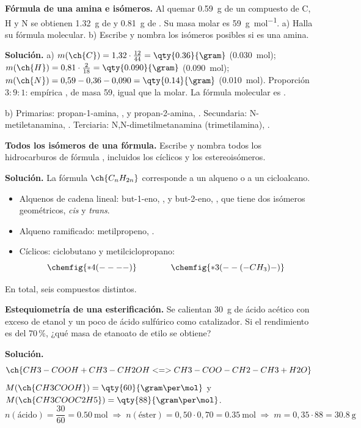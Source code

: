 \begin{example}
    \textbf{Fórmula de una amina e isómeros.} Al quemar \qty{0.59}{\gram} de un compuesto de C, H y N se obtienen
    \qty{1.32}{\gram} de  y \qty{0.81}{\gram} de . Su masa molar es \qty{59}{\gram\per\mol}. a) Halla su fórmula
    molecular. b) Escribe y nombra los isómeros posibles si es una amina.

    \textbf{Solución.} a) \(m(\ch{C}) = 1{,}32 \cdot \frac{12}{44} = \qty{0.36}{\gram}\) (\qty{0.030}{\mol});
    \(m(\ch{H}) = 0{,}81 \cdot \frac{2}{18} = \qty{0.090}{\gram}\) (\qty{0.090}{\mol}); \(m(\ch{N}) = 0{,}59 - 0{,}36 - 0{,}090 =
    \qty{0.14}{\gram}\) (\qty{0.010}{\mol}). Proporción \(3 : 9 : 1\): empírica , de masa 59, igual que la molar. La
    fórmula molecular es .

    b) Primarias: propan-1-amina, , y propan-2-amina, . Secundaria: N-metiletanamina,
    . Terciaria: N,N-dimetilmetanamina (trimetilamina), .
\end{example}

\begin{example}
    \textbf{Todos los isómeros de una fórmula.} Escribe y nombra todos los hidrocarburos de fórmula , incluidos los
    cíclicos y los estereoisómeros.

    \textbf{Solución.} La fórmula \(\ch{C_nH_{2n}}\) corresponde a un alqueno o a un cicloalcano.
    \begin{itemize}
        \item Alquenos de cadena lineal: but-1-eno, , y but-2-eno, , que tiene dos isómeros
        geométricos, \emph{cis} y \emph{trans}.
        \item Alqueno ramificado: metilpropeno, .
        \item Cíclicos: ciclobutano y metilciclopropano:
        \[ \chemfig{*4(----)} \qquad\qquad \chemfig{*3(--(-CH_3)-)} \]
    \end{itemize}
    En total, seis compuestos distintos.
\end{example}

\begin{example}
    \textbf{Estequiometría de una esterificación.} Se calientan \qty{30}{\gram} de ácido acético con exceso de etanol y un poco de
    ácido sulfúrico como catalizador. Si el rendimiento es del 70\,\%, ¿qué masa de etanoato de etilo se obtiene?

    \textbf{Solución.}
    \[ \ch{CH3-COOH + CH3-CH2OH <=> CH3-COO-CH2-CH3 + H2O} \]
    \(M(\ch{CH3COOH}) = \qty{60}{\gram\per\mol}\) y
    \(M(\ch{CH3COOC2H5}) = \qty{88}{\gram\per\mol}\).
    \[ n(\text{ácido}) = \frac{30}{60} = \qty{0.50}{\mol} \;\Rightarrow\; n(\text{éster}) = 0{,}50 \cdot 0{,}70 = \qty{0.35}{\mol}
       \;\Rightarrow\; m = 0{,}35 \cdot 88 = \qty{30.8}{\gram} \]
\end{example}

